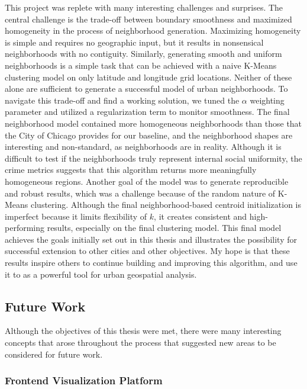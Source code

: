 \documentclass[times new roman,12pt]{article}
\begin{document}
This project was replete with many interesting challenges and surprises. The central challenge is the trade-off between boundary smoothness and maximized homogeneity in the process of neighborhood generation. Maximizing homogeneity is simple and requires no geographic input, but it results in nonsensical neighborhoods with no contiguity. Similarly, generating smooth and uniform neighborhoods is a simple task that can be achieved with a naive K-Means clustering model on only latitude and longitude grid locations. Neither of these alone are sufficient to generate a successful model of urban neighborhoods. To navigate this trade-off and find a working solution, we tuned the $\alpha$ weighting parameter and utilized a regularization term to monitor smoothness. The final neighborhood model contained more homogeneous neighborhoods than those that the City of Chicago provides for our baseline, and the neighborhood shapes are interesting and non-standard, as neighborhoods are in reality. Although it is difficult to test if the neighborhoods truly represent internal social uniformity, the crime metrics suggests that this algorithm returns more meaningfully homogeneous regions. Another goal of the model was to generate reproducible and robust results, which was a challenge because of the random nature of K-Means clustering. Although the final neighborhood-based centroid initialization is imperfect because it limits flexibility of $k$, it creates consistent and high-performing results, especially on the final clustering model. This final model achieves the goals initially set out in this thesis and illustrates the possibility for successful extension to other cities and other objectives. My hope is that these results inspire others to continue building and improving this algorithm, and use it to as a powerful tool for urban geospatial analysis. 

\subsection{Future Work}
\label{future_work}

Although the objectives of this thesis were met, there were many interesting concepts that arose throughout the process that suggested new areas to be considered for future work. 

\subsubsection{Frontend Visualization Platform}
\end{document}
